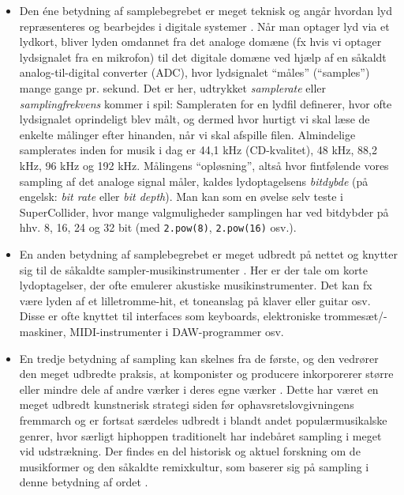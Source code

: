 \begin{itemize}
\item Den éne betydning af samplebegrebet er meget teknisk og angår hvordan lyd repræsenteres og bearbejdes i digitale systemer \parencite[p. 29]{roads2023}. Når man optager lyd via et lydkort, bliver lyden omdannet fra det analoge domæne (fx hvis vi optager lydsignalet fra en mikrofon) til det digitale domæne ved hjælp af en såkaldt analog-til-digital converter (ADC), hvor lydsignalet \enquote{måles} (\enquote{samples}) mange gange pr. sekund. Det er her, udtrykket \textit{samplerate} eller \textit{samplingfrekvens} kommer i spil: Sampleraten for en lydfil definerer, hvor ofte lydsignalet oprindeligt blev målt, og dermed hvor hurtigt vi skal læse de enkelte målinger efter hinanden, når vi skal afspille filen. Almindelige samplerates inden for musik i dag er 44,1 kHz (CD-kvalitet), 48 kHz, 88,2 kHz, 96 kHz og 192 kHz. Målingens \enquote{opløsning}, altså hvor fintfølende vores sampling af det analoge signal måler, kaldes lydoptagelsens \textit{bitdybde} (på engelsk: \textit{bit rate} eller \textit{bit depth}). Man kan som en øvelse selv teste i SuperCollider, hvor mange valgmuligheder samplingen har ved bitdybder på hhv. 8, 16, 24 og 32 bit (med \texttt{2.pow(8)}, \texttt{2.pow(16)} osv.).
\item En anden betydning af samplebegrebet er meget udbredt på nettet og knytter sig til de såkaldte sampler-musikinstrumenter \parencite[p. 107]{kvifte2007}. Her er der tale om korte lydoptagelser, der ofte emulerer akustiske musikinstrumenter. Det kan fx være lyden af et lilletromme-hit, et toneanslag på klaver eller guitar osv. Disse er ofte knyttet til interfaces som keyboards, elektroniske trommesæt/-maskiner, MIDI-instrumenter i DAW-programmer osv.
\item En tredje betydning af sampling kan skelnes fra de første, og den vedrører den meget udbredte praksis, at komponister og producere inkorporerer større eller mindre dele af andre værker i deres egne værker \parencite[p. 107]{kvifte2007}. Dette har været en meget udbredt kunstnerisk strategi siden før ophavsretslovgivningens fremmarch og er fortsat særdeles udbredt i blandt andet populærmusikalske genrer, hvor særligt hiphoppen traditionelt har indebåret sampling i meget vid udstrækning. Der findes en del historisk og aktuel forskning om de musikformer og den såkaldte remixkultur, som baserer sig på sampling i denne betydning af ordet \parencites{dyndahl2005, kvifte2007, miller2008, navas2012, rodgers2003, sewell2014, tillet2014}. 
\end{itemize}
